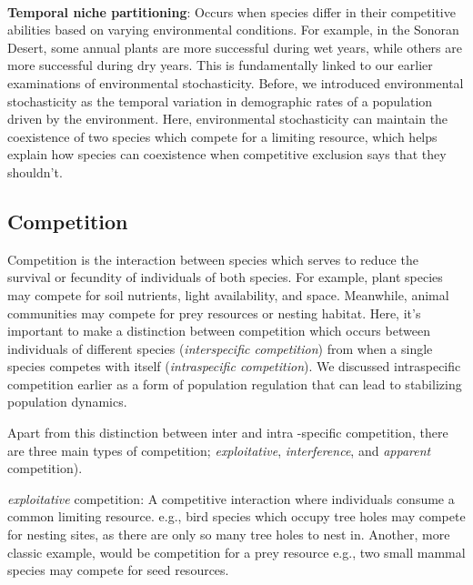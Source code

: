 \documentclass[12pt]{article}
\begin{document}
\paragraph*{}
\textbf{Temporal niche partitioning}: Occurs when species differ in their competitive abilities based on varying environmental conditions. For example, in the Sonoran Desert, some annual plants are more successful during wet years, while others are more successful during dry years. This is fundamentally linked to our earlier examinations of environmental stochasticity. Before, we introduced environmental stochasticity as the temporal variation in demographic rates of a population driven by the environment. Here, environmental stochasticity can maintain the coexistence of two species which compete for a limiting resource, which helps explain how species can coexistence when competitive exclusion says that they shouldn't.










\clearpage
\subsection*{Competition}

Competition is the interaction between species which serves to reduce the survival or fecundity of individuals of both species. For example, plant species may compete for soil nutrients, light availability, and space. Meanwhile, animal communities may compete for prey resources or nesting habitat. Here, it's important to make a distinction between competition which occurs between individuals of different species (\textit{interspecific competition}) from when a single species competes with itself (\textit{intraspecific competition}). We discussed intraspecific competition earlier as a form of population regulation that can lead to stabilizing population dynamics. 

Apart from this distinction between inter and intra -specific competition, there are three main types of competition; \textit{exploitative},  \textit{interference},  and \textit{apparent} competition). 

\textit{exploitative} competition: A competitive interaction where individuals consume a common limiting resource. e.g., bird species which occupy tree holes may compete for nesting sites, as there are only so many tree holes to nest in. Another, more classic example, would be competition for a prey resource e.g., two small mammal species may compete for seed resources. 
\end{document}
